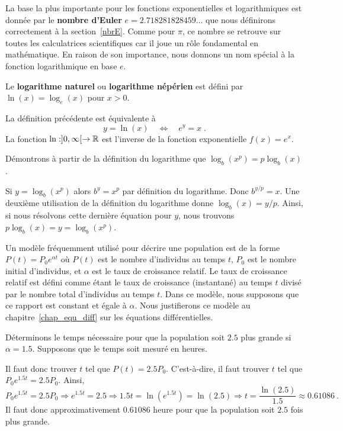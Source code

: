 {La base la plus importante pour les fonctions exponentielles et
logarithmiques est donnée par le {\bfseries nombre d'Euler}
$e = 2.718281828459\ldots$ que nous définirons correctement à la
section~\ref{nbrE}.  Comme pour $\pi$, ce nombre se retrouve sur
toutes les calculatrices scientifiques car il joue un rôle fondamental
en mathématique.  En raison de son importance, nous donnons un nom spécial
à la fonction logarithmique en base $e$.

\begin{defn} 
Le {\bfseries logarithme naturel} ou {\bfseries logarithme népérien}
est défini par $\ln(x) = \log_e(x)$ pour $x>0$.
\end{defn}

La définition précédente est équivalente à
\[
y=\ln(x) \quad \Leftrightarrow \quad e^y = x \; .
\]
La fonction $\ln:]0,\infty[\rightarrow \mathbb{R}$ est l'inverse de la fonction
exponentielle $f(x) = e^x$.

\begin{egg}
Démontrons à partir de la définition du logarithme que
$\log_b(x^p) = p \log_b(x)$.

Si $y = \log_b(x^p)$ alors $b^y = x^p$ par définition du logarithme.
Donc $b^{y/p} = x$.  Une deuxième utilisation de la définition du
logarithme donne $\log_b(x) = y/p$.  Ainsi, si nous résolvons cette
dernière équation pour $y$, nous trouvons $p\log_b(x) = y = \log_b(x^p)$.
\end{egg}

\begin{egg}
Un modèle fréquemment utilisé pour décrire une population est de la
forme $P(t) = P_0 e^{\alpha t}$ où $P(t)$ est le nombre d'individus au
temps $t$, $P_0$ est le nombre initial d'individus, et $\alpha$ est le
\lgm taux de croissance relatif\rgm.  Le taux de croissance relatif
est défini comme étant le taux de croissance (instantané) au temps $t$
divisé par le nombre total d'individus au temps $t$.  Dans ce modèle,
nous supposons que ce rapport est constant et égale à $\alpha$.  Nous
justifierons ce modèle au chapitre~\ref{chap_equ_diff} sur les équations
différentielles.

Déterminons le temps nécessaire pour que la population soit
$2.5$ plus grande si $\alpha =1.5$.  Supposons que le temps soit
mesuré en heures.

Il faut donc trouver $t$ tel que $\displaystyle P(t) = 2.5 P_0$.
C'est-à-dire, il faut trouver $t$ tel que $P_0 e^{1.5 t}  = 2.5 P_0$.  Ainsi,
\[
P_0 e^{1.5 t}  = 2.5 P_0 \Rightarrow e^{1.5 t}  = 2.5
\Rightarrow 1.5 t = \ln\left( e^{1.5 t} \right) = \ln(2.5)
\Rightarrow t = \frac{\ln(2.5)}{1.5} \approx 0.61086 \ .
\]
Il faut donc approximativement $0.61086$ heure pour que la population
soit $2.5$ fois plus grande.


\end{egg}}
